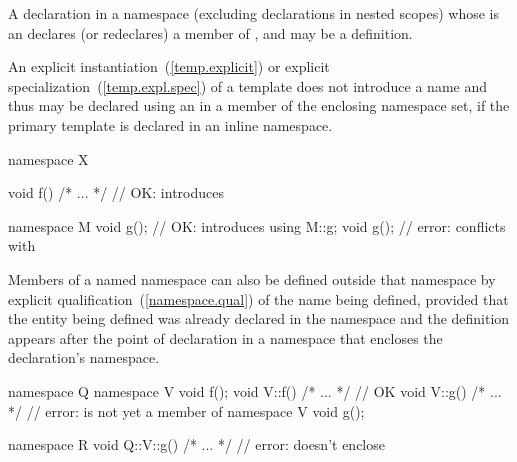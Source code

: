 \pnum
A declaration in a namespace  (excluding declarations in nested scopes)
whose  is an 
declares (or redeclares) a member of , and may be a definition.
\begin{note} An explicit instantiation~(\ref{temp.explicit}) or
explicit specialization~(\ref{temp.expl.spec}) of a template
does not introduce a name and thus may be declared using an
 in a member of the enclosing namespace set,
if the primary template is declared in an inline namespace. \end{note}
\begin{example}

\begin{codeblock}
namespace X {
  void f() { /* ... */ }  // OK: introduces 

  namespace M {
    void g();             // OK: introduces 
  }
  using M::g;
  void g();               // error: conflicts with 
}
\end{codeblock}
\end{example}

\pnum
Members of a named namespace can also be
defined outside that namespace by explicit
qualification~(\ref{namespace.qual}) of the name being defined, provided
that the entity being defined was already declared in the namespace and
the definition appears after the point of declaration in a namespace
that encloses the declaration's namespace.
\begin{example}

\begin{codeblock}
namespace Q {
  namespace V {
    void f();
  }
  void V::f() { /* ... */ }     // OK
  void V::g() { /* ... */ }     // error:  is not yet a member of 
  namespace V {
    void g();
  }
}

namespace R {
  void Q::V::g() { /* ... */ }  // error:  doesn't enclose 
}
\end{codeblock}
\end{example}

